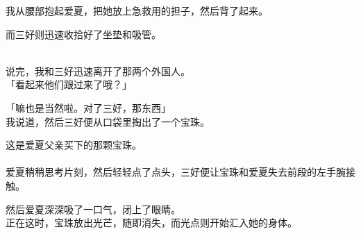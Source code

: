 我从腰部抱起爱夏，把她放上急救用的担子，然后背了起来。

而三好则迅速收拾好了坐垫和吸管。\\


\\

说完，我和三好迅速离开了那两个外国人。\\

「看起来他们跟过来了哦？」

「嘛也是当然啦。对了三好，那东西」\\

我说道，然后三好便从口袋里掏出了一个宝珠。

这是爱夏父亲买下的那颗宝珠。\\

\\

爱夏稍稍思考片刻，然后轻轻点了点头，三好便让宝珠和爱夏失去前段的左手腕接触。

然后爱夏深深吸了一口气，闭上了眼睛。\\

正在这时，宝珠放出光芒，随即消失，而光点则开始汇入她的身体。\\

